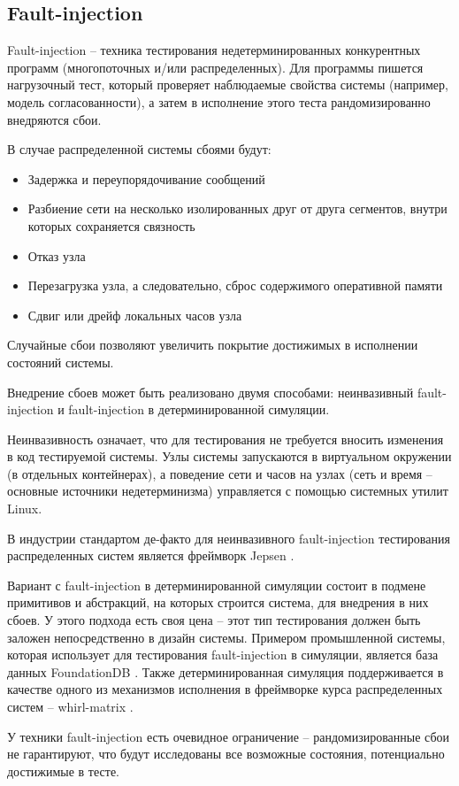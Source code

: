 \subsection{Fault-injection}

Fault-injection – техника тестирования недетерминированных конкурентных программ (многопоточных и/или распределенных). Для программы пишется нагрузочный тест, который проверяет наблюдаемые свойства системы (например, модель согласованности), а затем в исполнение этого теста рандомизированно внедряются сбои.

В случае распределенной системы сбоями будут:
\begin{itemize}
    \item Задержка и переупорядочивание сообщений 
    \item Разбиение сети на несколько изолированных друг от друга сегментов, внутри которых сохраняется связность
    \item Отказ узла
    \item Перезагрузка узла, а следовательно, сброс содержимого оперативной памяти
    \item Сдвиг или дрейф локальных часов узла
\end{itemize}

Случайные сбои позволяют увеличить покрытие достижимых в исполнении состояний системы.

Внедрение сбоев может быть реализовано двумя способами: неинвазивный fault-injection и fault-injection в детерминированной симуляции.

Неинвазивность означает, что для тестирования не требуется вносить изменения в код тестируемой системы. Узлы системы запускаются в виртуальном окружении (в отдельных контейнерах), а поведение сети и часов на узлах (сеть и время – основные источники недетерминизма) управляется с помощью системных утилит Linux.

В индустрии стандартом де-факто для неинвазивного fault-injection тестирования распределенных систем является фреймворк Jepsen \cite{jepsen}.

Вариант с fault-injection в детерминированной симуляции состоит в подмене примитивов и абстракций, на которых строится система, для внедрения в них сбоев. У этого подхода есть своя цена – этот тип тестирования должен быть заложен непосредственно в дизайн системы. Примером промышленной системы, которая использует для тестирования fault-injection в симуляции, является база данных FoundationDB \cite{foundation_db}. Также детерминированная симуляция поддерживается в качестве одного из механизмов исполнения в фреймворке курса распределенных систем – whirl-matrix \cite{whirl}.

У техники fault-injection есть очевидное ограничение – рандомизированные сбои не гарантируют, что будут исследованы все возможные состояния, потенциально достижимые в тесте. 
